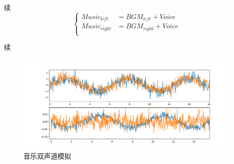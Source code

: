 \documentclass{beamer}
\begin{document}
\begin{frame}{续}
    \[
        \left\{
            \begin{aligned}
                Music_{left} &= BGM_{left} + Voice\\
                Music_{right}&= BGM_{right} + Voice\\
            \end{aligned}
        \right.
    \]

\begin{figure}[h]
    \centering
    \hspace{0.2in}
    \hspace{0.2in}
\end{figure}
\end{frame}

\begin{frame}{续}
\begin{figure}[h]
    \centering
    \includegraphics[width=0.9\linewidth]{figs/sin-rand.png}
    \caption{音乐双声道模拟}
\end{figure}
\end{frame}
\end{document}
